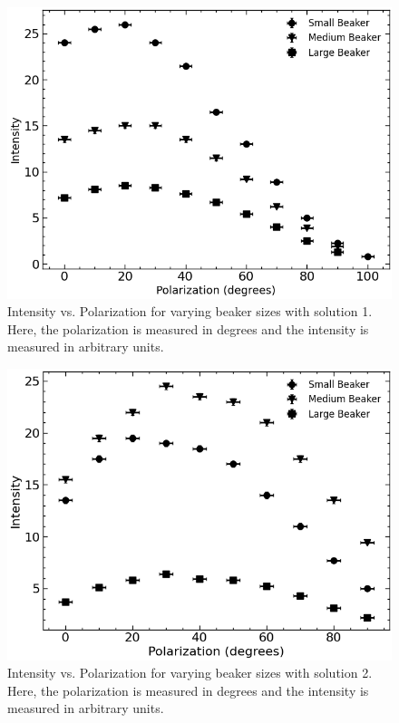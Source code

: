 \begin{figure}[H]
    \begin{center}
        \includegraphics[width=\columnwidth]{../figures/solution1.png}
    \end{center}
    \caption{Intensity vs. Polarization for varying beaker sizes with solution 1. Here, the polarization is measured in degrees and the intensity is measured in arbitrary units.}
    \label{fig:solution1}
\end{figure}

\begin{figure}[H]
    \begin{center}
        \includegraphics[width=\columnwidth]{../figures/solution2.png}
    \end{center}
    \caption{Intensity vs. Polarization for varying beaker sizes with solution 2. Here, the polarization is measured in degrees and the intensity is measured in arbitrary units.}
    \label{fig:solution2}
\end{figure}

